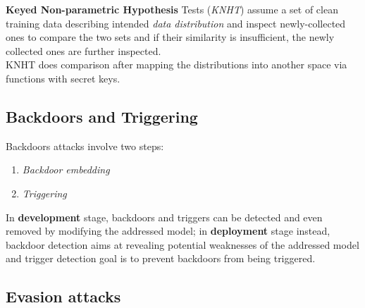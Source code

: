 \textbf{Keyed Non-parametric Hypothesis} Tests (\textit{KNHT}) assume a set of clean training data describing intended \textit{data distribution} and
inspect newly-collected ones to compare the two sets and if their similarity
is insufficient, the newly collected ones are further inspected.\\
KNHT does comparison after mapping the distributions into another space
via functions with secret keys.

\subsection{Backdoors and Triggering}
Backdoors attacks involve two steps:
\begin{enumerate}
   \item \textit{Backdoor embedding}
   \item \textit{Triggering}
\end{enumerate}

In \textbf{development} stage, backdoors and triggers can be detected and
even removed by modifying the addressed model;
in \textbf{deployment} stage instead, backdoor detection aims at revealing potential
weaknesses of the addressed model and trigger detection goal is to
prevent backdoors from being triggered.

\subsection{Evasion attacks}